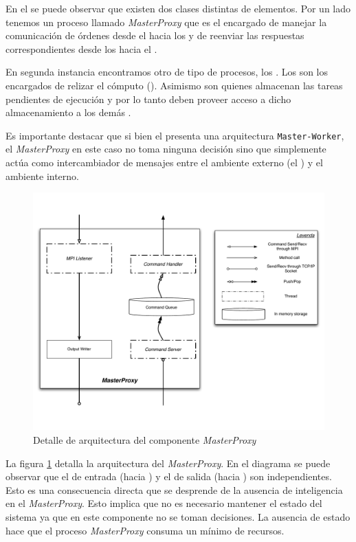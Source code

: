 \newcommand{\master}{\emph{MasterProxy}\xspace}

En el \bend se puede observar que existen dos clases distintas de elementos.
Por un lado tenemos un proceso llamado \master que es el encargado de manejar
la comunicación de órdenes desde el \fend hacia los \ws y de reenviar las
respuestas correspondientes desde los \ws hacia el \fend.

En segunda instancia encontramos otro de tipo de procesos, los \ws. Los \ws
son los encargados de relizar el cómputo (\ssolving). Asimismo son quienes
almacenan las tareas pendientes de ejecución y por lo tanto deben proveer
acceso a dicho almacenamiento a los demás \ws.

\newcommand{\masterslave}{\texttt{Master-Worker}\xspace}

Es importante destacar que si bien el \bend presenta una arquitectura
\masterslave, el \master en este caso no toma ninguna decisión sino que
simplemente actúa como intercambiador de mensajes entre el ambiente externo
(el \fend) y el ambiente interno.

\begin{figure}
\centering
\label{fig:masterproxydetail}
\includegraphics[scale=0.3]{graphs/master proxy detail}
\caption{Detalle de arquitectura del componente \master}
\end{figure}

La figura \ref{fig:masterproxydetail} detalla la arquitectura del \master. En
el diagrama se puede observar que el \datapath{} de entrada (\fend hacia \bend) y el de salida (\bend hacia
\fend) son independientes. Esto es una consecuencia directa que se desprende
de la ausencia de inteligencia en el \master. Esto implica que no es necesario
mantener el estado del sistema ya que en este componente no se toman
decisiones. La ausencia de estado hace que el proceso \master consuma un
mínimo de recursos.

